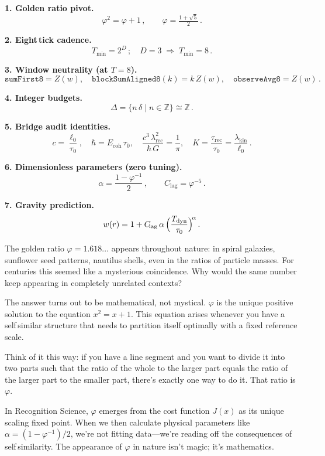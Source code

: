 \documentclass[11pt]{article}
\begin{document}
\begin{tcolorbox}[
  colback=rsgold!10,
  colframe=rsgold!80!black,
  boxrule=1.5pt,
  arc=2mm,
  title={\textbf{Key Results from T1--T8}}
]
\textbf{1. Golden ratio pivot.}
\[\varphi^2=\varphi+1\,,\qquad \varphi=\tfrac{1+\sqrt5}{2}\,.\]

\textbf{2. Eight\,tick cadence.}
\[T_{\min}=2^D\,;\quad D=3 \;\Rightarrow\; T_{\min}=8\,.\]

\textbf{3. Window neutrality (at $T=8$).}
\[\texttt{sumFirst8}=Z(w),\quad \texttt{blockSumAligned8}(k)=k\,Z(w),\quad \texttt{observeAvg8}=Z(w)\,.\]

\textbf{4. Integer budgets.}
\[\Delta=\{n\,\delta\mid n\in\mathbb Z\}\cong\mathbb Z\,.\]

\textbf{5. Bridge audit identities.}
\[c=\frac{\ell_0}{\tau_0},\quad \hbar=E_{\mathrm{coh}}\,\tau_0,\quad \frac{c^3\,\lambda_{\mathrm{rec}}^2}{\hbar\,G}=\frac{1}{\pi},\quad K=\frac{\tau_{\mathrm{rec}}}{\tau_0}=\frac{\lambda_{\mathrm{kin}}}{\ell_0}\,.\]

\textbf{6. Dimensionless parameters (zero tuning).}
\[\alpha=\frac{1-\varphi^{-1}}{2}\,,\qquad C_{\!\mathrm{lag}}=\varphi^{-5}\,.\]

\textbf{7. Gravity prediction.}
\[w(r)=1 + C_{\!\mathrm{lag}}\,\alpha\,\Bigl(\frac{T_{\mathrm{dyn}}}{\tau_0}\Bigr)^{\!\alpha}\,.\]
\end{tcolorbox}

\begin{explanationbox}
The golden ratio $\varphi=1.618\ldots$ appears throughout nature: in spiral galaxies, sunflower seed patterns, nautilus shells, even in the ratios of particle masses. For centuries this seemed like a mysterious coincidence. Why would the same number keep appearing in completely unrelated contexts?

The answer turns out to be mathematical, not mystical. $\varphi$ is the unique positive solution to the equation $x^2=x+1$. This equation arises whenever you have a self\,similar structure that needs to partition itself optimally with a fixed reference scale.

Think of it this way: if you have a line segment and you want to divide it into two parts such that the ratio of the whole to the larger part equals the ratio of the larger part to the smaller part, there's exactly one way to do it. That ratio is $\varphi$.

In Recognition Science, $\varphi$ emerges from the cost function $J(x)$ as its unique scaling fixed point. When we then calculate physical parameters like $\alpha=(1-\varphi^{-1})/2$, we're not fitting data—we're reading off the consequences of self\,similarity. The appearance of $\varphi$ in nature isn't magic; it's mathematics.
\end{explanationbox}
\end{document}

